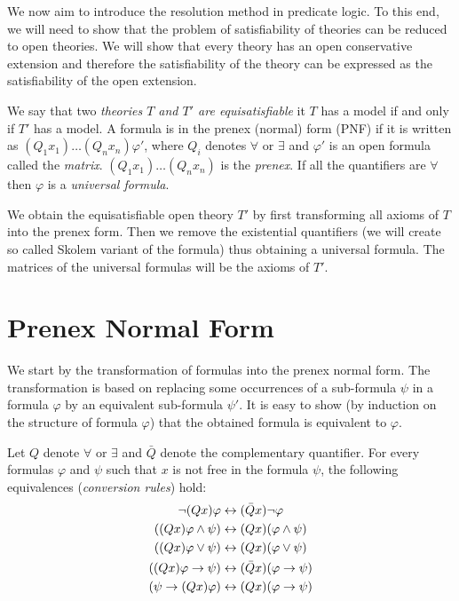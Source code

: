 We now aim to introduce the resolution method in predicate logic. To this end, we will need to show that the problem of satisfiability of theories can be reduced to open theories. We will show that every theory has an open conservative extension and therefore the satisfiability of the theory can be expressed as the satisfiability of the open extension. 

We say that two \emph{theories $T$ and $T'$ are equisatisfiable} it $T$ has a model if and only if $T'$ has a model. A formula is in the prenex (normal) form (PNF) if it is written as $(Q_1 x_1)\dots(Q_n x_n)\varphi'$, where $Q_i$ denotes $\forall$ or $\exists$ and $\varphi'$ is an open formula called the \emph{matrix}. $(Q_1 x_1)\dots(Q_n x_n)$ is the \emph{prenex}. If all the quantifiers are $\forall$ then $\varphi$ is a \emph{universal formula}.

We obtain the equisatisfiable open theory $T'$ by first transforming all axioms of $T$ into the prenex form. Then we remove the existential quantifiers (we will create so called Skolem variant of the formula) thus obtaining a universal formula. The matrices of the universal formulas will be the axioms of $T'$.

\section{Prenex Normal Form}

We start by the transformation of formulas into the prenex normal form. The transformation is based on replacing some occurrences of a sub-formula $\psi$ in a formula $\varphi$ by an equivalent sub-formula $\psi'$. It is easy to show (by induction on the structure of formula $\varphi$) that the obtained formula is equivalent to $\varphi$.

Let $Q$ denote $\forall$ or $\exists$ and $\bar{Q}$ denote the complementary quantifier. For every formulas $\varphi$ and $\psi$ such that $x$ is not free in the formula $\psi$, the following equivalences (\emph{conversion rules}) hold:
\begin{align*}
\neg(Qx)\varphi & \leftrightarrow (\bar{Q}x)\neg \varphi \\
((Qx)\varphi \land \psi) & \leftrightarrow (Qx)(\varphi \land \psi) \\
((Qx)\varphi \lor \psi) & \leftrightarrow (Qx)(\varphi \lor \psi) \\
((Qx)\varphi \to \psi) & \leftrightarrow (\bar{Q}x)(\varphi \to \psi) \\
(\psi \to (Qx) \varphi) & \leftrightarrow (Qx)(\varphi \to \psi)
\end{align*}

